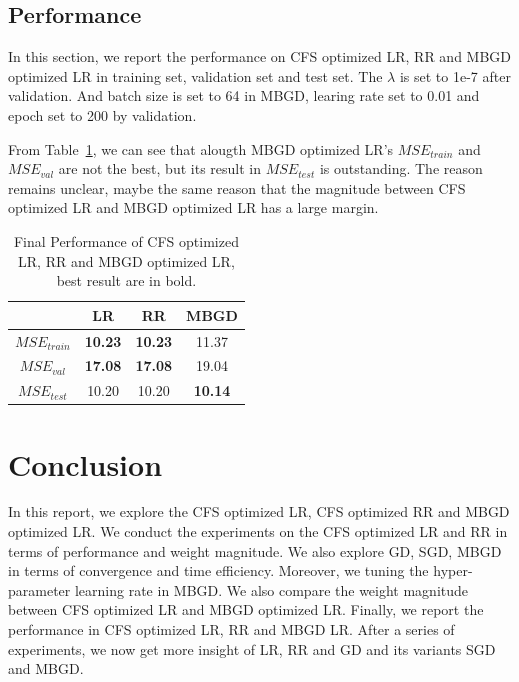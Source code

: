 \documentclass[journal, a4paper]{IEEEtran}
\begin{document}
\subsection{Performance} 
In this section, we report the performance on CFS optimized LR, RR and MBGD optimized LR in training set, validation set and test set. The $\lambda$ is set to 1e-7 after validation. And batch size is set to 64 in MBGD, learing rate set to 0.01 and epoch set to 200 by validation. \par
From Table~\ref{tab:Performance}, we can see that alougth MBGD optimized LR's $MSE_{train}$ and $MSE_{val}$ are not the best, but its result in $MSE_{test}$ is outstanding. The reason remains unclear, maybe the same reason that the magnitude between CFS optimized LR and MBGD optimized LR has a large margin. \par
\begin{table}[!hbt]
	\begin{center}
		\caption{Final Performance of CFS optimized LR, RR and MBGD optimized LR, best result are in bold.}
		\label{tab:Performance}
		\begin{tabular}{|c|c|c|c|}
			\hline
			& LR & RR & MBGD \\
			\hline
			$MSE_{train}$   & \textbf{10.23} & \textbf{10.23} & 11.37   \\
			\hline
			$MSE_{val}$  & \textbf{17.08} & \textbf{17.08} & 19.04   \\
			\hline
			$MSE_{test}$  & 10.20 &  10.20 & \textbf{10.14}  \\
			\hline
		\end{tabular}
	\end{center}
\end{table}

\section{Conclusion}
In this report, we explore the CFS optimized LR, CFS optimized RR and MBGD optimized LR. We conduct the experiments on the CFS optimized LR and RR in terms of performance and weight magnitude. We also explore GD, SGD, MBGD in terms of convergence and time efficiency. Moreover, we tuning the hyper-parameter learning rate in MBGD. We also compare the weight magnitude between CFS optimized LR and MBGD optimized LR. Finally, we report the performance in CFS optimized LR, RR and MBGD LR. After a series of experiments, we now get more insight of LR, RR and GD and its variants SGD and MBGD. \par



\end{document}
